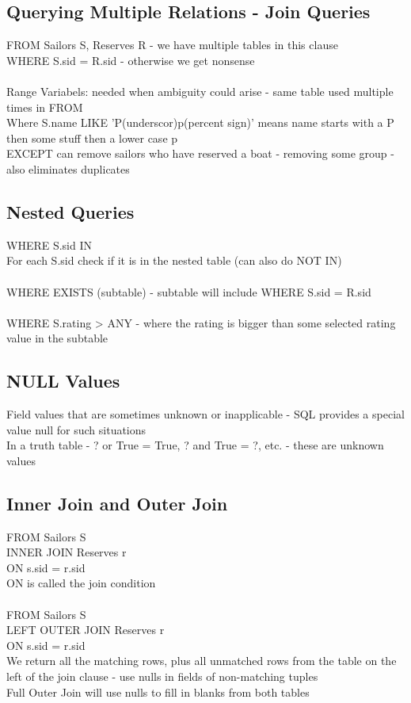 \documentclass{article}
\begin{document}
\subsection{Querying Multiple Relations - Join Queries}
FROM Sailors S, Reserves R - we have multiple tables in this clause \\ 
WHERE S.sid = R.sid - otherwise we get nonsense \\ \\
Range Variabels: needed when ambiguity could arise - same table used multiple times in FROM \\ 
Where S.name LIKE 'P(underscor)p(percent sign)' means name starts with a P then some stuff then a lower case p \\ 
EXCEPT can remove sailors who have reserved a boat - removing some group - also eliminates duplicates

\subsection{Nested Queries}
WHERE S.sid IN \\ 
For each S.sid check if it is in the nested table (can also do NOT IN) \\  \\
WHERE EXISTS (subtable) - subtable will include WHERE S.sid = R.sid \\ \\ 
WHERE S.rating > ANY - where the rating is bigger than some selected rating value in the subtable

\subsection{NULL Values}
Field values that are sometimes unknown or inapplicable - SQL provides a special value null for such situations \\ 
In a truth table - ? or True = True, ? and True = ?, etc. - these are unknown values

\subsection{Inner Join and Outer Join}
FROM Sailors S \\ INNER JOIN Reserves r \\ ON s.sid = r.sid \\
ON is called the join condition \\ \\
FROM Sailors S \\ LEFT OUTER JOIN Reserves r \\ ON s.sid = r.sid \\
We return all the matching rows, plus all unmatched rows from the table on the left of the join clause - use nulls in fields of non-matching tuples \\
Full Outer Join will use nulls to fill in blanks from both tables
\end{document}
